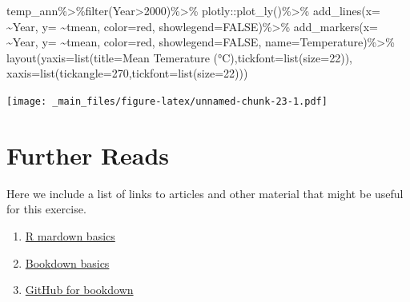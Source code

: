 \documentclass[
]{book}
\newenvironment{Shaded}{\begin{snugshade}}{\end{snugshade}}
\newcommand{\AttributeTok}[1]{\textcolor[rgb]{0.77,0.63,0.00}{#1}}
\newcommand{\ConstantTok}[1]{\textcolor[rgb]{0.00,0.00,0.00}{#1}}
\newcommand{\DecValTok}[1]{\textcolor[rgb]{0.00,0.00,0.81}{#1}}
\newcommand{\FunctionTok}[1]{\textcolor[rgb]{0.00,0.00,0.00}{#1}}
\newcommand{\NormalTok}[1]{#1}
\newcommand{\SpecialCharTok}[1]{\textcolor[rgb]{0.00,0.00,0.00}{#1}}
\newcommand{\StringTok}[1]{\textcolor[rgb]{0.31,0.60,0.02}{#1}}
\providecommand{\tightlist}{%
  \setlength{\itemsep}{0pt}\setlength{\parskip}{0pt}}
\begin{document}
\begin{Shaded}
\begin{Highlighting}[]
\NormalTok{temp\_ann}\SpecialCharTok{\%\textgreater{}\%}\FunctionTok{filter}\NormalTok{(Year}\SpecialCharTok{\textgreater{}}\DecValTok{2000}\NormalTok{)}\SpecialCharTok{\%\textgreater{}\%}\NormalTok{ plotly}\SpecialCharTok{::}\FunctionTok{plot\_ly}\NormalTok{()}\SpecialCharTok{\%\textgreater{}\%}
 \FunctionTok{add\_lines}\NormalTok{(}\AttributeTok{x=} \SpecialCharTok{\textasciitilde{}}\NormalTok{Year, }\AttributeTok{y=} \SpecialCharTok{\textasciitilde{}}\NormalTok{tmean, }\AttributeTok{color=}\StringTok{\textquotesingle{}red\textquotesingle{}}\NormalTok{, }\AttributeTok{showlegend=}\ConstantTok{FALSE}\NormalTok{)}\SpecialCharTok{\%\textgreater{}\%}
  \FunctionTok{add\_markers}\NormalTok{(}\AttributeTok{x=} \SpecialCharTok{\textasciitilde{}}\NormalTok{Year, }\AttributeTok{y=} \SpecialCharTok{\textasciitilde{}}\NormalTok{tmean, }\AttributeTok{color=}\StringTok{\textquotesingle{}red\textquotesingle{}}\NormalTok{, }\AttributeTok{showlegend=}\ConstantTok{FALSE}\NormalTok{, }
              \AttributeTok{name=}\StringTok{\textquotesingle{}Temperature\textquotesingle{}}\NormalTok{)}\SpecialCharTok{\%\textgreater{}\%}
  \FunctionTok{layout}\NormalTok{(}\AttributeTok{yaxis=}\FunctionTok{list}\NormalTok{(}\AttributeTok{title=}\StringTok{\textquotesingle{}Mean Temerature (°C)\textquotesingle{}}\NormalTok{,}\AttributeTok{tickfont=}\FunctionTok{list}\NormalTok{(}\AttributeTok{size=}\DecValTok{22}\NormalTok{)),}
         \AttributeTok{xaxis=}\FunctionTok{list}\NormalTok{(}\AttributeTok{tickangle=}\DecValTok{270}\NormalTok{,}\AttributeTok{tickfont=}\FunctionTok{list}\NormalTok{(}\AttributeTok{size=}\DecValTok{22}\NormalTok{)))}
\end{Highlighting}
\end{Shaded}

\texttt{[image: \_main\_files/figure-latex/unnamed-chunk-23-1.pdf]}

\hypertarget{further-reads}{%
\chapter{Further Reads}\label{further-reads}}

Here we include a list of links to articles and other material that might be useful for this exercise.

\begin{enumerate}
\def\labelenumi{\arabic{enumi}.}
\tightlist
\item
  \href{https://bookdown.org/yihui/rmarkdown/}{R mardown basics}
\item
  \href{https://bookdown.org/yihui/bookdown/}{Bookdown basics}
\item
  \href{https://bookdown.org/yihui/bookdown/github.html}{GitHub for bookdown}
\end{enumerate}

  
\end{document}
